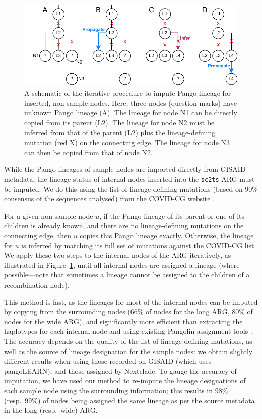 \documentclass{article}
\begin{document}
\begin{figure} \centering
\includegraphics[width=.7\textwidth]{figures/imputation.pdf}
\caption{\label{fig:imputation}A schematic of the iterative procedure to impute
Pango lineage for inserted, non-sample nodes. Here, three nodes (question
marks) have unknown Pango lineage (A). The lineage for node N1 can be directly
copied from its parent (L2). The lineage for node N2 must be inferred from
that of the parent (L2) plus the lineage-defining mutation (red X)
on the connecting edge. The lineage for node N3 can then be copied from
that of node N2.}
\end{figure}
While the Pango lineages of sample nodes are imported directly from
GISAID metadata, the lineage status of internal nodes inserted into
the \texttt{sc2ts} ARG must be imputed. We do this using
the list of lineage-defining mutations (based on 90\% consensus
of the sequences analysed) from the COVID-CG website \citep[][\url{https://covidcg.org/}; accessed on 4 November 2022]{Chen2021-zc}.

For a given non-sample node $u$, if the Pango lineage of its parent or
one of its children is already known, and there are no lineage-defining mutations
on the connecting edge, then $u$ copies this Pango lineage exactly.
Otherwise, the lineage for $u$ is inferred by
matching its full set of mutations against the COVID-CG list.
We apply these two steps to the internal nodes of the ARG iteratively,
as illustrated in Figure~\ref{fig:imputation}, until all internal nodes
are assigned a lineage (where possible---note that sometimes a lineage cannot
be assigned to the children of a recombination node).

This method is fast, as the lineages for most of the internal nodes can be
imputed by copying from the surrounding nodes (66\% of nodes for the long ARG,
80\% of nodes for the wide ARG), and significantly more efficient than extracting
the haplotypes for each internal node and using existing Pangolin assignment tools
\citep{OToole2021-assignment}. The
accuracy depends on the quality of the list of lineage-defining mutations,
as well as the source of lineage designation for the sample nodes: we obtain
slightly different results when using those recorded on GISAID (which uses
pangoLEARN), and those assigned by Nextclade. To gauge the accuracy of
imputation, we have used our method to re-impute the lineage designations of each
sample node using the surrounding information; this results in 98\% (resp.~99\%) of
nodes being assigned the same lineage as per the source metadata in the long
(resp.~wide) ARG.
\end{document}
